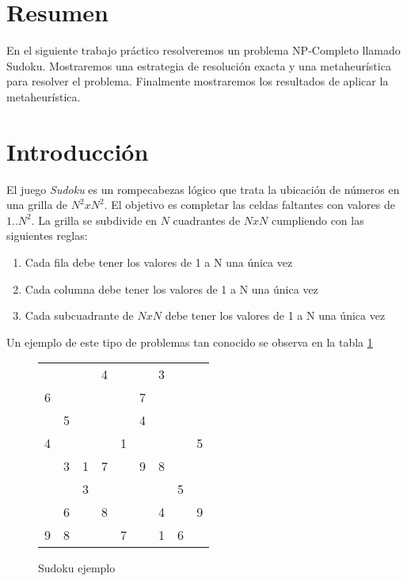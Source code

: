 \documentclass[a4paper,spanish]{article}
\begin{document}


\tableofcontents
\pagebreak

\section{Resumen}
En el siguiente trabajo práctico resolveremos un problema NP-Completo llamado
Sudoku. Mostraremos una estrategia de resolución exacta y una metaheurística
para resolver el problema. Finalmente mostraremos los resultados de aplicar la
metaheurística.


\section{Introducción}

El juego \emph{Sudoku} es un rompecabezas lógico que trata la ubicación de
números en una grilla de $N^2 x N^2$. El objetivo es completar las celdas
faltantes con valores de $1..N^2$. La grilla se subdivide en $N$ cuadrantes de
$N x N$  cumpliendo con las siguientes reglas:

\begin{enumerate}
    \item Cada fila debe tener los valores de 1 a N una única vez
    \item Cada columna debe tener los valores de 1 a N una única vez
    \item Cada subcuadrante de $NxN$ debe tener los valores de 1 a N una única vez
\end{enumerate}

Un ejemplo de este tipo de problemas tan conocido se observa en la tabla
\ref{tab:sudoku_ejemplo}

\begin{figure}[H]
    \begin{center}
        \begin{tabular}{||c | c | c|| c| c| c|| c| c| c||}
            \hline
            \hline
            &   &   &   &   &   &   &   &   \\
            \hline
            &   &   & 4 &   &   & 3 &   &   \\
            \hline
            6 &   &   &   &   & 7 &   &   &   \\
            \hline
            \hline
            & 5 &   &   &   & 4 &   &   &   \\
            \hline
            4 &   &   &   & 1 &   &   &   & 5 \\
            \hline
            & 3 & 1 & 7 &   & 9 & 8 &   &   \\
            \hline
            \hline
            &   & 3 &   &   &   &   & 5 &   \\
            \hline
            & 6 &   & 8 &   &   & 4 &   & 9 \\
            \hline
            9 & 8 &   &   & 7 &   & 1 & 6 &   \\
            \hline
            \hline

        \end{tabular}
        \label{tab:sudoku_ejemplo}
        \caption{Sudoku ejemplo}
    \end{center}
\end{figure}
\end{document}
